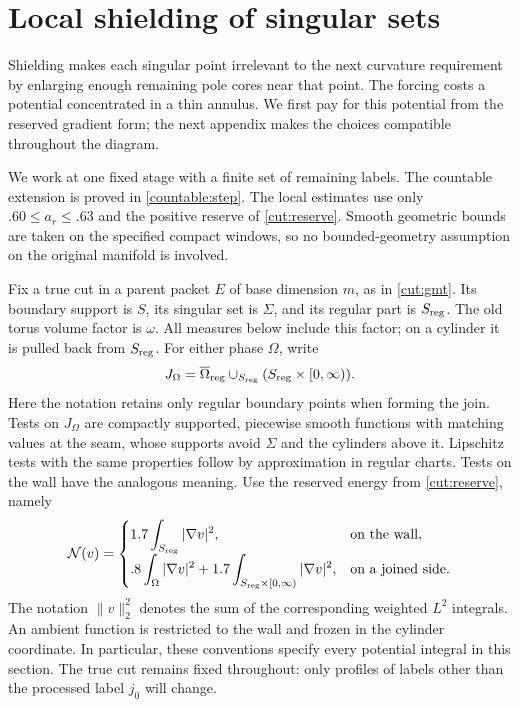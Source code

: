 \documentclass[11pt]{article}
\numberwithin{equation}{section}
\theoremstyle{definition}
\theoremstyle{remark}
\begin{document}
\section{Local shielding of singular sets}\label{sec:local}

Shielding makes each singular point irrelevant to the next curvature
requirement by enlarging enough remaining pole cores near that point.
The forcing costs a potential concentrated in a thin annulus.  We
first pay for this potential from the reserved gradient form; the
next appendix makes the choices compatible throughout the diagram.

We work at one fixed stage with a finite set of remaining labels.
The countable extension is proved in \cref{countable:step}.  The local
estimates use only $.60\le a_r\le .63$ and the positive reserve of
\cref{cut:reserve}.  Smooth geometric bounds are taken on the specified
compact windows, so no bounded-geometry assumption on the original
manifold is involved.

Fix a true cut in a parent packet $E$ of base dimension $m$, as in
\cref{cut:gmt}.  Its boundary support is $S$, its singular set is $\Sigma$,
and its regular part is $S_{\rm reg}$.  The old torus volume factor is
$\omega$.  All measures below include this factor; on a cylinder it is
pulled back from $S_{\rm reg}$.  For either phase $\Omega$, write
\[
 J_\Omega=\overline\Omega_{\rm reg}\mathbin{\cup}_{S_{\rm reg}}
             (S_{\rm reg}\times[0,\infty)).
\]
Here the notation retains only regular boundary points when forming the
join.  Tests on $J_\Omega$ are compactly supported, piecewise smooth
functions with matching values at the seam, whose supports avoid
$\Sigma$ and the cylinders above it.  Lipschitz tests with the same
properties follow by approximation in regular charts.  Tests on the
wall have the analogous meaning.  Use the reserved energy from
\cref{cut:reserve}, namely
\begin{equation}\label{local:norm}
 \mathcal N(v)=
 \begin{cases}
  1.7\displaystyle\int_{S_{\rm reg}}|\nabla v|^2,&\text{on the wall},\\[3pt]
  .8\displaystyle\int_\Omega|\nabla v|^2+
  1.7\displaystyle\int_{S_{\rm reg}\times[0,\infty)}|\nabla v|^2,
       &\text{on a joined side}.
 \end{cases}
\end{equation}
The notation $\|v\|_2^2$ denotes the sum of the corresponding weighted
$L^2$ integrals.  An ambient function is restricted to the wall and
frozen in the cylinder coordinate.  In particular, these conventions
specify every potential integral in this section.  The true cut remains
fixed throughout: only profiles of labels other than the processed
label $j_0$ will change.
\end{document}
